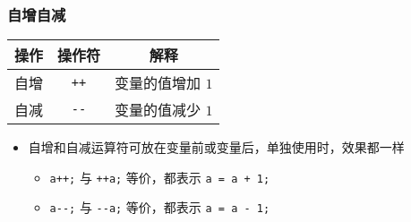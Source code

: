 \begin{frame}[fragile]
    \frametitle{自增自减}

    \begin{table}[]
        \begin{tabular}{ccc}
            \toprule
            操作 & 操作符         & 解释             \\
            \midrule
            自增 & \lstinline|++| & 变量的值增加 $1$ \\
            自减 & \lstinline|--| & 变量的值减少 $1$ \\
            \bottomrule
        \end{tabular}
    \end{table}

    \begin{itemize}
        \item<2-> 自增和自减运算符可放在变量前或变量后，单独使用时，效果都一样

            \begin{itemize}
                \item \lstinline|a++;| 与 \lstinline|++a;| 等价，都表示 \lstinline|a = a + 1;|
                \item \lstinline|a--;| 与 \lstinline|--a;| 等价，都表示 \lstinline|a = a - 1;|
            \end{itemize}

    \end{itemize}
\end{frame}

